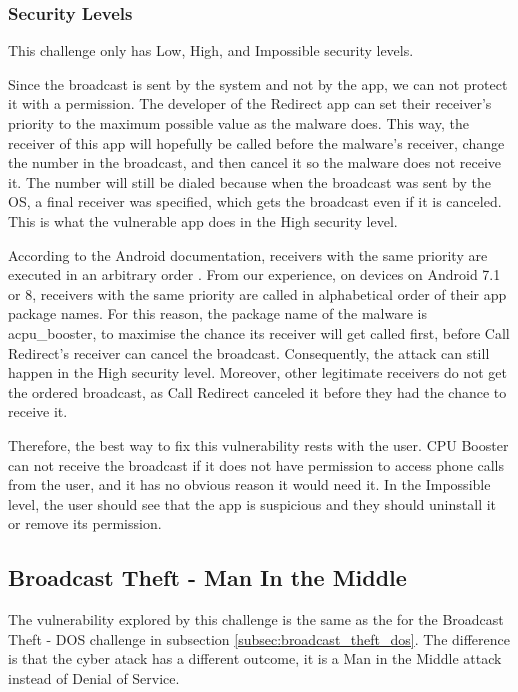     \subsubsection{Security Levels}
        \label{subsubsec:broadcast_theft_dos_security_levels}
        
    This challenge only has Low, High, and Impossible security levels.
        
    Since the broadcast is sent by the system and not by the app, we can not protect it with a permission. The developer of the Redirect app can set their receiver's priority to the maximum possible value as the malware does. This way, the receiver of this app will hopefully be called before the malware's receiver, change the number in the broadcast, and then cancel it so the malware does not receive it. The number will still be dialed because when the broadcast was sent by the OS, a final receiver was specified, which gets the broadcast even if it is canceled. This is what the vulnerable app does in the High security level.

    According to the Android documentation, receivers with the same priority are executed in an arbitrary order \cite{broadcasts_overview}. From our experience, on devices on Android 7.1 or 8, receivers with the same priority are called in alphabetical order of their app package names. For this reason, the package name of the malware is acpu\_booster, to maximise the chance its receiver will get called first, before Call Redirect's receiver can cancel the broadcast. Consequently, the attack can still happen in the High security level. Moreover, other legitimate receivers do not get the ordered broadcast, as Call Redirect canceled it before they had the chance to receive it.

    Therefore, the best way to fix this vulnerability rests with the user. CPU Booster can not receive the broadcast if it does not have permission to access phone calls from the user, and it has no obvious reason it would need it. In the Impossible level, the user should see that the app is suspicious and they should uninstall it or remove its permission.  
    
    \subsection{Broadcast Theft - Man In the Middle}
        \label{subsec:broadcast_theft_mitm}
        
    The vulnerability explored by this challenge is the same as the for the Broadcast Theft - DOS challenge in subsection \ref{subsec:broadcast_theft_dos}. The difference is that the cyber atack has a different outcome, it is a Man in the Middle attack instead of Denial of Service.

